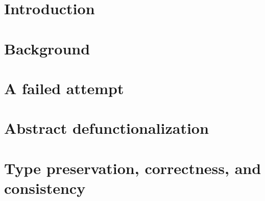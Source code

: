\documentclass[a4paper,12pt]{report}
\theoremstyle{definition}
\begin{document}
% 
% 
% 


\onehalfspacing


\chapter{Introduction}
\setcounter{page}{1} 


\setcounter{chapter}{1}
\chapter{Background}


\setcounter{chapter}{2}
\chapter{A failed attempt}


\setcounter{chapter}{3}
\chapter{Abstract defunctionalization}


\setcounter{chapter}{4}
\chapter{Type preservation, correctness, and consistency}


\singlespacing
{}
 
 
\end{document}

